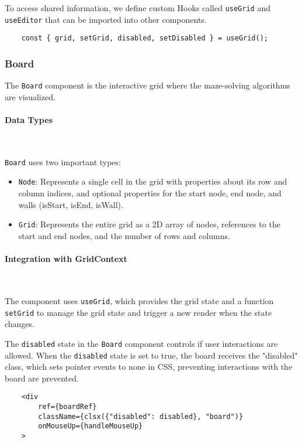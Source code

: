 To access shared information, we define custom Hooks called \texttt{useGrid} and \texttt{useEditor} that can be imported into other components.

\begin{verbatim}
    const { grid, setGrid, disabled, setDisabled } = useGrid();
\end{verbatim}

\subsubsection{Board}
The \texttt{Board} component is the interactive grid where the maze-solving algorithms are visualized.

\paragraph{Data Types} \

\texttt{Board} uses two important types:
\begin{itemize}
    \item \texttt{Node}: Represents a single cell in the grid with properties about its row and column indices, and optional properties for the start node, end node, and walls (isStart, isEnd, isWall).
    \item \texttt{Grid}: Represents the entire grid as a 2D array of nodes, references to the start and end nodes, and the number of rows and columns.
\end{itemize}

\paragraph{Integration with GridContext} \

The component uses \texttt{useGrid}, which provides the grid state and a function \texttt{setGrid} to manage the grid state and trigger a new render when the state changes.

The \texttt{disabled} state in the \texttt{Board} component controls if user interactions are allowed. When the \texttt{disabled} state is set to true, the board receives the "disabled" class, which sets pointer events to none in CSS, preventing interactions with the board are prevented.

\begin{verbatim}
    <div
        ref={boardRef}
        className={clsx({"disabled": disabled}, "board")}
        onMouseUp={handleMouseUp}
    >
\end{verbatim}

